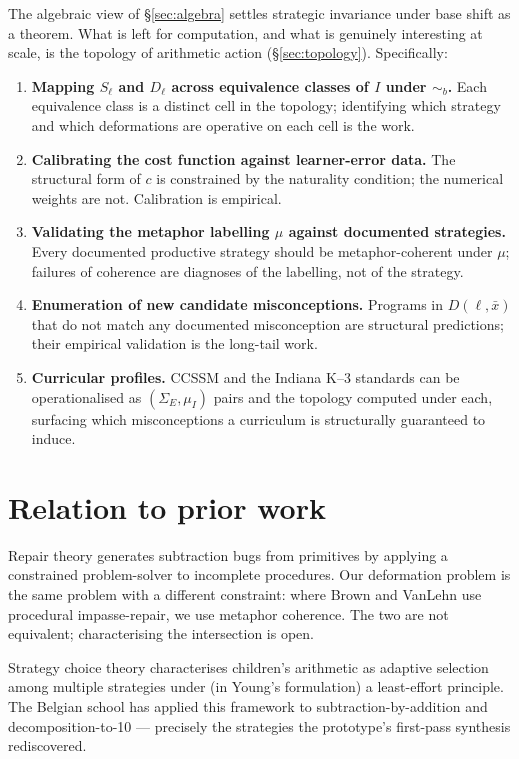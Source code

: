 \documentclass[11pt]{article}
\begin{document}
The algebraic view of \S\ref{sec:algebra} settles strategic invariance
under base shift as a theorem. What is left for computation, and what
is genuinely interesting at scale, is the topology of arithmetic
action (\S\ref{sec:topology}). Specifically:
\begin{enumerate}[noitemsep,topsep=2pt]
  \item \textbf{Mapping $S_\ell$ and $D_\ell$ across equivalence
        classes of $I$ under $\sim_b$.} Each equivalence class is a
        distinct cell in the topology; identifying which strategy and
        which deformations are operative on each cell is the work.
  \item \textbf{Calibrating the cost function against learner-error
        data.} The structural form of $c$ is constrained by the
        naturality condition; the numerical weights are not.
        Calibration is empirical.
  \item \textbf{Validating the metaphor labelling $\mu$ against
        documented strategies.} Every documented productive strategy
        should be metaphor-coherent under $\mu$; failures of
        coherence are diagnoses of the labelling, not of the strategy.
  \item \textbf{Enumeration of new candidate misconceptions.}
        Programs in $D(\ell, \bar{x})$ that do not match any
        documented misconception are structural predictions; their
        empirical validation is the long-tail work.
  \item \textbf{Curricular profiles.} CCSSM and the Indiana K--3
        standards can be operationalised as
        $(\Sigma_E, \mu_I)$ pairs and the topology computed under
        each, surfacing which misconceptions a curriculum is
        structurally guaranteed to induce.
\end{enumerate}

\section{Relation to prior work}\label{sec:related}

Repair theory \parencite{brownvanlehn1980, vanlehn1990} generates
subtraction bugs from primitives by applying a constrained
problem-solver to incomplete procedures. Our deformation problem is
the same problem with a different constraint: where Brown and VanLehn
use procedural impasse-repair, we use metaphor coherence. The two are
not equivalent; characterising the intersection is open.

Strategy choice theory \parencite{siegler1988, lemaireSiegler1995,
shragerSiegler1998, young2000} characterises children's arithmetic as
adaptive selection among multiple strategies under (in Young's
formulation) a least-effort principle. The Belgian school has applied
this framework to subtraction-by-addition and decomposition-to-10
\parencite{torbeyns2005, torbeyns2018} — precisely the strategies the
prototype's first-pass synthesis rediscovered.
\end{document}
